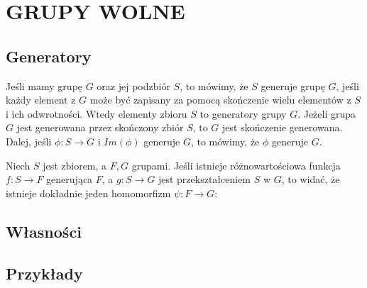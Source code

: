 \section{GRUPY WOLNE}

\subsection{Generatory}
Jeśli mamy grupę $G$ oraz jej podzbiór $S$, to mówimy, że $S$ {\color{def}generuje} grupę $G$, jeśli każdy element z $G$ może być zapisany za pomocą skończenie wielu elementów z $S$ i ich odwrotności. Wtedy elementy zbioru $S$ to {\color{acc}generatory} grupy $G$. Jeżeli grupa $G$ jest generowana przez skończony zbiór $S$, to $G$ jest {\color{acc}skończenie generowana}. Dalej, jeśli $\phi:S\to G$ i $Im(\phi)$ generuje $G$, to mówimy, że {\color{acc}$\phi$ generuje $G$}. 
\medskip

Niech $S$ jest zbiorem, a $F,G$ grupami. Jeśli istnieje różnowartościowa funkcja $f:S\to F$ generująca $F$, a $g:S\to G$ jest przekształceniem $S$ w $G$, to widać, że istnieje dokładnie jeden homomorfizm $\psi:F\to G$:

\begin{center}
\end{center}

\subsection{Własności}

\subsection{Przykłady}